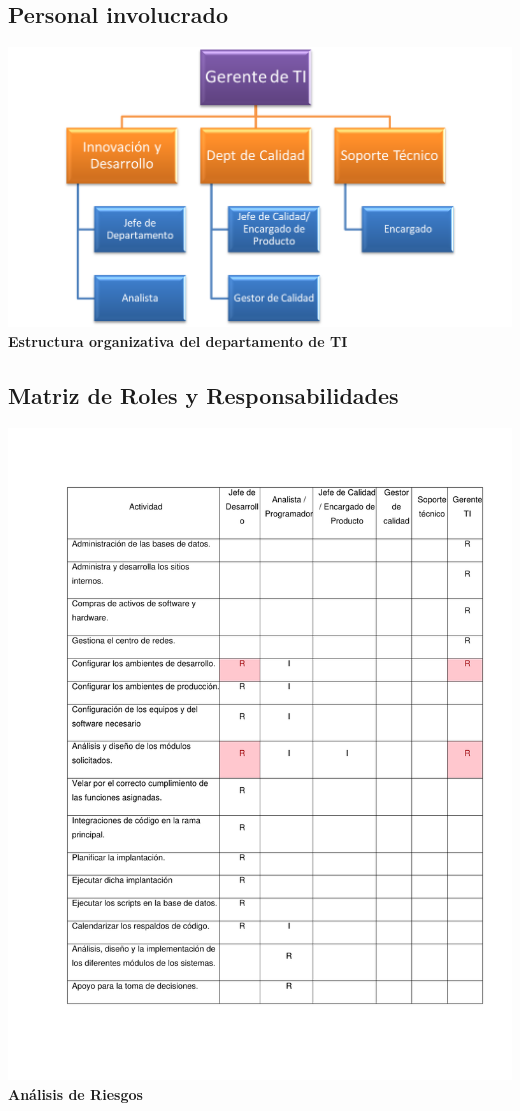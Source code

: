 \documentclass[conference]{IEEEtran}
\begin{document}
\subsection{Personal involucrado}
\hbox{}
    \begin{center}
        \includegraphics[width=.5\textwidth]{Imagenes/Organigrama Viejo.png}
        \textbf {Estructura organizativa del departamento de TI}
    \end{center}
\hbox{}
\subsection{Matriz de Roles y Responsabilidades}
        \begin{center}
            \includegraphics[width=.5\textwidth]{Documentos/Matriz RACI01.pdf}
            \textbf {Análisis de Riesgos}
        \end{center}
        
\end{document}
